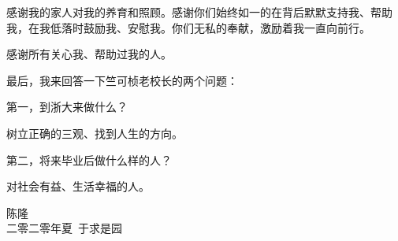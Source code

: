 \begin{thanks}
感谢我的家人对我的养育和照顾。感谢你们始终如一的在背后默默支持我、帮助我，在我低落时鼓励我、安慰我。你们无私的奉献，激励着我一直向前行。

感谢所有关心我、帮助过我的人。

最后，我来回答一下竺可桢老校长的两个问题：

第一，到浙大来做什么？

树立正确的三观、找到人生的方向。

第二，将来毕业后做什么样的人？

对社会有益、生活幸福的人。

\textbf{}

\begin{flushright}
	\begin{minipage}{12em}
	\begin{center}
		陈隆
		\\ 二零二零年夏\ 于求是园
	\end{center}
	\end{minipage}
\end{flushright}

\end{thanks}
